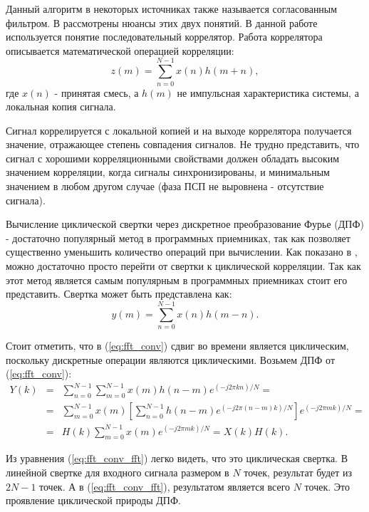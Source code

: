 Данный алгоритм в некоторых источниках также называется согласованным фильтром. В \cite{sklyar} рассмотрены нюансы этих двух понятий.
В данной работе используется понятие последовательный коррелятор. Работа коррелятора описывается математической операцией
корреляции:
\begin{equation}
	\label{eq:serial_corr}
	z(m)=\sum\limits_{n=0}^{N-1}{x(n)h(m+n)},
\end{equation}
где ${x(n)}$ - принятая смесь, а ${h(m)}$ не импульсная характеристика системы, а локальная копия сигнала.

Сигнал коррелируется с локальной копией и на выходе коррелятора получается значение, отражающее
степень совпадения сигналов. Не трудно представить, что сигнал с хорошими корреляционными свойствами должен обладать высоким значением
корреляции, когда сигналы синхронизированы, и минимальным значением в любом другом случае (фаза ПСП не выровнена - отсутствие сигнала).


Вычисление циклической свертки через дискретное преобразование Фурье (ДПФ) - достаточно популярный метод
в программных приемниках, так как позволяет существенно уменьшить количество операций при вычислении. Как показано
в \cite{tsui, oppenheim}, можно достаточно просто перейти от свертки к циклической корреляции. Так как этот метод является самым
популярным в программных приемниках стоит его представить.
Свертка может быть представлена как:
\begin{equation}
	\label{eq:fft_conv}
	y(m)=\sum\limits_{n=0}^{N-1}{x(n)h(m-n)}.
\end{equation}

Стоит отметить, что в (\ref{eq:fft_conv}) сдвиг во времени является циклическим, поскольку дискретные операции являются циклическими.
Возьмем ДПФ от (\ref{eq:fft_conv}):
\begin{eqnarray}
	\label{eq:fft_conv_fft}
	Y(k) & = & \sum\limits_{n=0}^{N-1}\sum\limits_{m=0}^{N-1}{x(m)h(n-m)e^{(-j2\pi{kn})/N}}=\nonumber \\
	& = & \sum\limits_{m=0}^{N-1}{x(m)}[\sum\limits_{n=0}^{N-1}h(n-m)e^{(-j2\pi{(n-m)}k)/N}]e^{(-j2\pi{m}k)/N}=\\
	& = & H(k)\sum\limits_{m=0}^{N-1}x(m)e^{(-j2\pi{m}k)/N} = X(k)H(k)\nonumber.
\end{eqnarray}

Из уравнения (\ref{eq:fft_conv_fft}) легко видеть, что это циклическая свертка. В линейной свертке для входного сигнала размером в ${N}$ точек,
результат будет из ${2N-1}$ точек. А в (\ref{eq:fft_conv_fft}), результатом является всего ${N}$ точек.
Это проявление циклической природы ДПФ.

